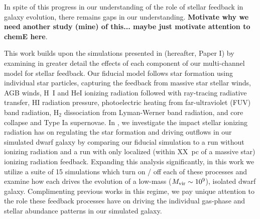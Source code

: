 \documentclass[twocolumn]{aastex62}
\newcommand{\methodpaper}{Paper I}
\begin{document}
In spite of this progress in our understanding of the role of stellar feedback in galaxy evolution, there remains gaps in our understanding. \textbf{Motivate why we need another study (mine) of this... maybe just motivate attention to chemE here}.






This work builds upon the simulations presented in \citet{Emerick2019} (hereafter, \methodpaper) by examining in greater detail the effects of each component of our multi-channel model for stellar feedback. Our fiducial model follows star formation using individual star particles, capturing the feedback from massive star stellar winds, AGB winds, H~I and HeI ionizing radiation followed with ray-tracing radiative transfer, HI radiation pressure, photoelectric heating from far-ultraviolet (FUV) band radiation, H$_2$ dissociation from Lyman-Werner band radiation, and core collapse and Type Ia supernovae. In \citet{Emerick2018a}, we investigate the impact stellar ionizing radiation has on regulating the star formation and driving outflows in our simulated dwarf galaxy by comparing our fiducial simulation to a run without ionizing radiation and a run with only localized (within XX~pc of a massive star) ionizing radiation feedback. Expanding this analysis significantly, in this work we utilize a suite of 15 simulations which turn on / off each of these processes and examine how each drives the evolution of a low-mass ($M_{\rm vir} \sim 10^{9}$), isolated dwarf galaxy. Complimenting previous works in this regime, we pay unique attention to the role these feedback processes have on driving the individual gas-phase and stellar abundance patterns in our simulated galaxy.
\end{document}
